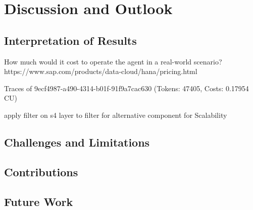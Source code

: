 \chapter{Discussion and Outlook}
\label{chap:Discussion}

\section{Interpretation of Results}
How much would it cost to operate the agent in a real-world scenario?
https://www.sap.com/products/data-cloud/hana/pricing.html


Traces of 9ecf4987-a490-4314-b01f-91f9a7cac630 (Tokens: 47405, Costs: 0.17954 CU)


apply filter on s4 layer to filter for alternative component for Scalability
\section{Challenges and Limitations}


\section{Contributions}

\section{Future Work}
